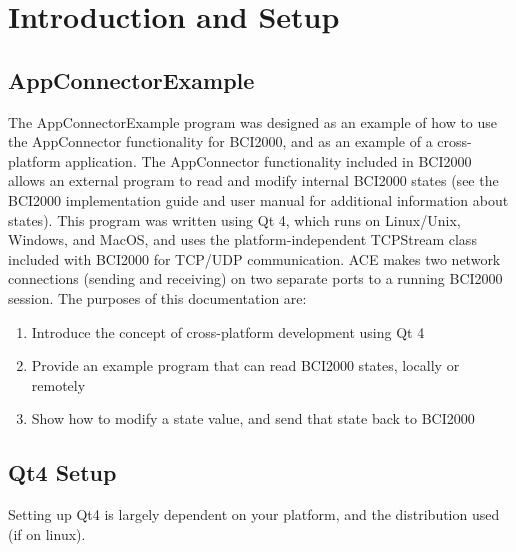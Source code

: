 \section{Introduction and Setup}
\subsection{AppConnectorExample}The AppConnectorExample program was designed as an example of how to use the AppConnector functionality for BCI2000, and as an example of a cross-platform application. The AppConnector functionality included in BCI2000 allows an external program to read and modify internal BCI2000 states (see the BCI2000 implementation guide and user manual for additional information about states). This program was written using Qt 4, which runs on Linux/Unix, Windows, and MacOS, and uses the platform-independent TCPStream class included with BCI2000 for TCP/UDP communication. ACE makes two network connections (sending and receiving) on two separate ports to a running BCI2000 session. The purposes of this documentation are:
\begin{enumerate}
 \item Introduce the concept of cross-platform development using Qt 4
 \item Provide an example program that can read BCI2000 states, locally or remotely
 \item Show how to modify a state value, and send that state back to BCI2000
\end{enumerate}

\subsection{Qt4 Setup}
Setting up Qt4 is largely dependent on your platform, and the distribution used (if on linux).
